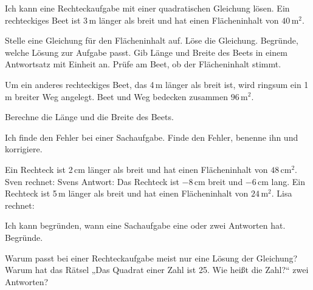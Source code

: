 
\begin{aufgabe}{Ich kann eine Rechteckaufgabe mit einer quadratischen Gleichung lösen.}
Ein rechteckiges Beet ist 3\,m länger als breit und hat einen Flächeninhalt von $40\,\text{m}^2$.


\begin{teile}
\teil Stelle eine Gleichung für den Flächeninhalt auf. \hfill \leerfeld
\teil Löse die Gleichung. \hfill {} \quad {}
\teil Begründe, welche Lösung zur Aufgabe passt.
\teil Gib Länge und Breite des Beets in einem Antwortsatz mit Einheit an.
\teil Prüfe am Beet, ob der Flächeninhalt stimmt.
\end{teile}
Um ein anderes rechteckiges Beet, das 4\,m länger als breit ist, wird ringsum ein 1\,m breiter Weg angelegt. Beet und Weg bedecken zusammen $96\,\text{m}^2$.


\begin{teile}
\teil Berechne die Länge und die Breite des Beets. \hfill {} \quad {}
\end{teile}
\end{aufgabe}

\begin{aufgabe}{Ich finde den Fehler bei einer Sachaufgabe.}
Finde den Fehler, benenne ihn und korrigiere.
\begin{teile}
\teil Ein Rechteck ist 2\,cm länger als breit und hat einen Flächeninhalt von $48\,\text{cm}^2$. Sven rechnet:
Svens Antwort: Das Rechteck ist $-8$\,cm breit und $-6$\,cm lang.
\teil Ein Rechteck ist 5\,m länger als breit und hat einen Flächeninhalt von $24\,\text{m}^2$. Lisa rechnet:
\end{teile}
\end{aufgabe}

\begin{aufgabe}{Ich kann begründen, wann eine Sachaufgabe eine oder zwei Antworten hat.}
Begründe.
\begin{teile}
\teil Warum passt bei einer Rechteckaufgabe meist nur eine Lösung der Gleichung?
\teil Warum hat das Rätsel „Das Quadrat einer Zahl ist 25. Wie heißt die Zahl?“ zwei Antworten?
\end{teile}
\end{aufgabe}
